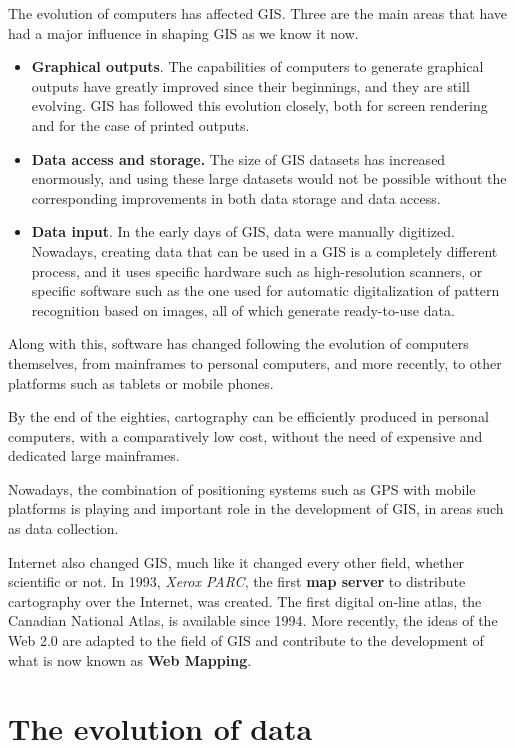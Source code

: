 The evolution of computers has affected GIS. Three are the main areas that have had a major influence in shaping GIS as we know it now.

\begin{itemize}
 \item \textbf{Graphical outputs}. The capabilities of computers to generate graphical outputs have greatly improved since their beginnings, and they are still evolving. GIS has followed this evolution closely, both for screen rendering and for the case of printed outputs.
\item \textbf{Data access and storage.} The size of GIS datasets has increased enormously, and using these large datasets would not be possible without the corresponding improvements in both data storage and data access.
\item \textbf{Data input}. In the early days of GIS, data were manually digitized. Nowadays, creating data that can be used in a GIS is a completely different process, and it uses specific hardware such as high-resolution scanners, or specific software such as the one used for automatic digitalization of pattern recognition based on images, all of which generate ready-to-use data.
\end{itemize}

Along with this, software has changed following the evolution of computers themselves, from mainframes to personal computers, and more recently, to other platforms such as tablets or mobile phones.

By the end of the eighties, cartography can be efficiently produced in personal computers, with a comparatively low cost, without the need of expensive and dedicated large mainframes.

Nowadays, the combination of positioning systems such as GPS with mobile platforms is playing and important role in the development of GIS, in areas such as data collection.

Internet also changed GIS, much like it changed every other field, whether scientific or not. In 1993, \emph{Xerox PARC}, the first \textbf{map server} to distribute cartography over the Internet, was created. The first digital on-line atlas, the Canadian National Atlas, is available since 1994. More recently, the ideas of the Web 2.0 are adapted to the field of GIS and contribute to the development of what is now known as \textbf{Web Mapping}.

\section{The evolution of data}

